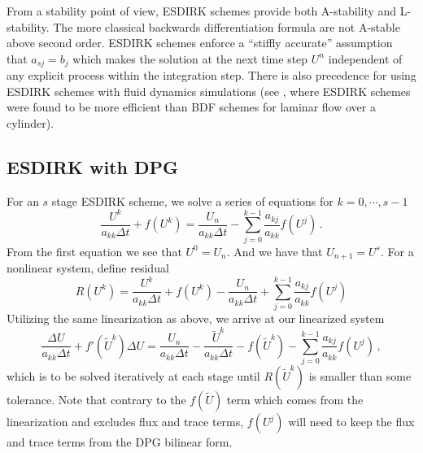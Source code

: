 \documentclass[Proposal.tex]{subfiles}
\begin{document}
From a stability point of view, ESDIRK schemes provide both A-stability and L-stability. 
The more classical backwards differentiation formula are not A-stable above second order.
ESDIRK schemes enforce a ``stiffly accurate'' assumption that $a_{sj}=b_j$ which makes the solution at the next time step $U^n$ independent of any explicit process within the integration step.
There is also precedence for using ESDIRK schemes with fluid dynamics simulations (see \cite{Bijl2002}, where ESDIRK schemes were found to be more efficient than BDF schemes for laminar flow over a cylinder).

\subsection{ESDIRK with DPG}
For an $s$ stage ESDIRK scheme, we solve a series of equations for $k=0,\cdots,s-1$
\begin{equation*}
\frac{U^k}{a_{kk}\Delta t}+f(U^k)=\frac{U_n}{a_{kk}\Delta
t}-\sum_{j=0}^{k-1}\frac{a_{kj}}{a_{kk}}f(U^j)\,.
\end{equation*}
From the first equation we see that $U^0=U_n$. And we have that $U_{n+1}=U^s$.
For a nonlinear system, define residual
\[
R(U^k) =
\frac{U^k}{a_{kk}\Delta t}+f(U^k)-\frac{U_n}{a_{kk}\Delta
t}+\sum_{j=0}^{k-1}\frac{a_{kj}}{a_{kk}}f(U^j)
\]
Utilizing the same linearization as above, we arrive at our linearized system
\begin{equation}
	\label{eq:ESDIRKScheme}
	\frac{\Delta U}{a_{kk}\Delta t}+f'(\tilde U^k)\Delta U
	=\frac{U_n}{a_{kk}\Delta t}-\frac{\tilde U^k}{a_{kk}\Delta t}-f(\tilde U^k)
	-\sum_{j=0}^{k-1}\frac{a_{kj}}{a_{kk}}f(U^j)\,,
	\end{equation}
which is to be solved iteratively at each stage until $R(\tilde U^k)$ is smaller than some tolerance.
Note that contrary to the $f(\tilde U)$ term which comes from the linearization and excludes flux and trace terms,
$f(U^j)$ will need to keep the flux and trace terms from the DPG bilinear form.

\end{document}
